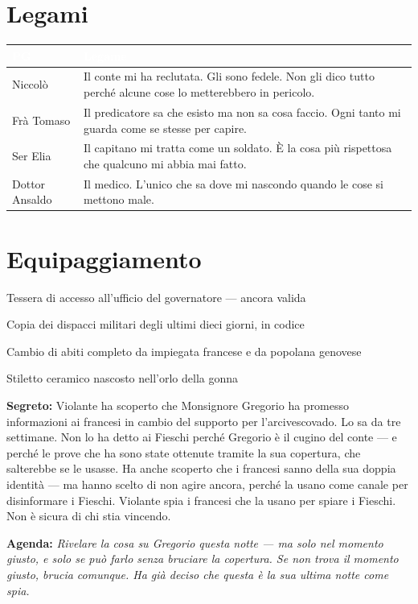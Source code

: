 \section*{Legami}

\begin{table}[h]
\centering\renewcommand{\arraystretch}{1.4}
\begin{tabularx}{\linewidth}{@{}L{2.6cm} X@{}}
  \toprule{}
  \textcolor{white}{\textbf{PG}} & \textcolor{white}{\textbf{Legame}} \\
  \midrule
  Niccolò & Il conte mi ha reclutata. Gli sono fedele. Non gli dico tutto perché alcune cose lo metterebbero in pericolo. \\
  Frà Tomaso & Il predicatore sa che esisto ma non sa cosa faccio. Ogni tanto mi guarda come se stesse per capire. \\
  Ser Elia & Il capitano mi tratta come un soldato. È la cosa più rispettosa che qualcuno mi abbia mai fatto. \\
  Dottor Ansaldo & Il medico. L'unico che sa dove mi nascondo quando le cose si mettono male. \\
  \bottomrule
\end{tabularx}
\end{table}

\section*{Equipaggiamento}
\begin{goldlist}
  \item Tessera di accesso all'ufficio del governatore — ancora valida
  \item Copia dei dispacci militari degli ultimi dieci giorni, in codice
  \item Cambio di abiti completo da impiegata francese e da popolana genovese
  \item Stiletto ceramico nascosto nell'orlo della gonna
\end{goldlist}


\begin{secretbox}
  \textbf{Segreto:} Violante ha scoperto che Monsignore Gregorio ha promesso
  informazioni ai francesi in cambio del supporto per l'arcivescovado.
  Lo sa da tre settimane. Non lo ha detto ai Fieschi perché Gregorio è
  il cugino del conte — e perché le prove che ha sono state ottenute
  tramite la sua copertura, che salterebbe se le usasse.
  Ha anche scoperto che i francesi sanno della sua doppia identità —
  ma hanno scelto di non agire ancora, perché la usano come canale
  per disinformare i Fieschi. Violante spia i francesi che la usano
  per spiare i Fieschi. Non è sicura di chi stia vincendo.

  \medskip\noindent\textcolor{SecretRed}{\textbf{Agenda:}}
  \textit{Rivelare la cosa su Gregorio questa notte — ma solo nel momento
  giusto, e solo se può farlo senza bruciare la copertura. Se non trova
  il momento giusto, brucia comunque. Ha già deciso che questa è la sua
  ultima notte come spia.}
\end{secretbox}

